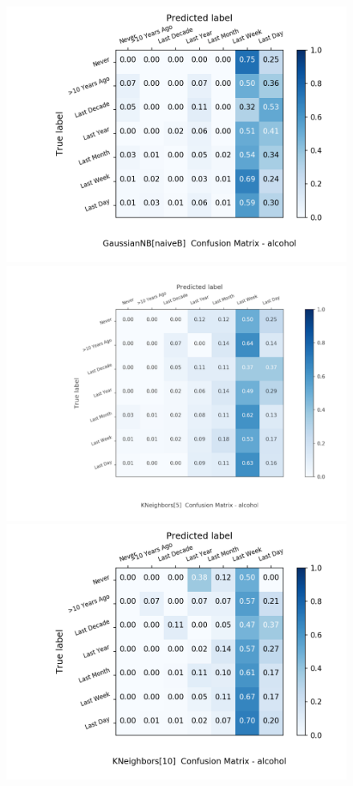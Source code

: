 \documentclass{article}
\begin{document}
\begin{figure}[h!]
\begin{minipage}[b]{0.32\textwidth}
		\includegraphics[width=\textwidth]{Plots/alcohol_GaussianNB_naiveB.png}
	\end{minipage}
	\begin{minipage}[b]{0.32\textwidth}
		\includegraphics[width=\textwidth]{Plots/alcohol_KNeighbors_5.png}
  \end{minipage}
	\begin{minipage}[b]{0.32\textwidth}
		\includegraphics[width=\textwidth]{Plots/alcohol_KNeighbors_10.png}

\end{minipage}
\end{figure}
\end{document}
